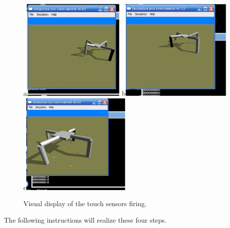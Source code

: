 \documentclass[12pt]{article}
\begin{document}
\begin{figure}
\centerline{
a\includegraphics[height=5cm]{Quad1}
b\includegraphics[height=5cm]{Quad2}
c\includegraphics[height=5cm]{Quad3}}
\caption{Visual display of the touch sensors firing.}
\label{Fig1}
\end{figure}

The following instructions will realize these four steps.
\end{document}
